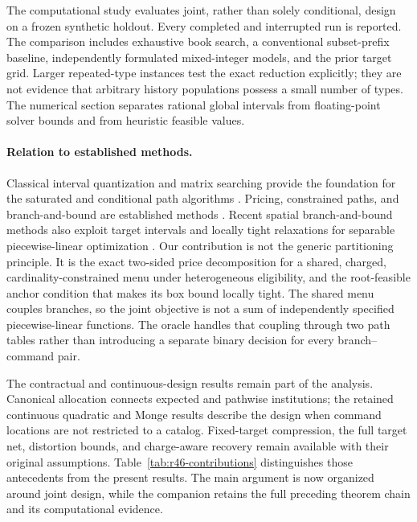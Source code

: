 The computational study evaluates joint, rather than solely conditional, design on a frozen synthetic holdout. Every completed and interrupted run is reported. The comparison includes exhaustive book search, a conventional subset-prefix baseline, independently formulated mixed-integer models, and the prior target grid. Larger repeated-type instances test the exact reduction explicitly; they are not evidence that arbitrary history populations possess a small number of types. The numerical section separates rational global intervals from floating-point solver bounds and from heuristic feasible values.

\paragraph{Relation to established methods.}\label{sec:r37-position}
Classical interval quantization and matrix searching provide the foundation for the saturated and conditional path algorithms \citep{Wu1991,NielsenNock2014,GronlundEtAl2017}. Pricing, constrained paths, and branch-and-bound are established methods \citep{HandlerZang1980,LawlerWood1966,Lemarechal2001}. Recent spatial branch-and-bound methods also exploit target intervals and locally tight relaxations for separable piecewise-linear optimization \citep{HubnerEtAl2025}. Our contribution is not the generic partitioning principle. It is the exact two-sided price decomposition for a shared, charged, cardinality-constrained menu under heterogeneous eligibility, and the root-feasible anchor condition that makes its box bound locally tight. The shared menu couples branches, so the joint objective is not a sum of independently specified piecewise-linear functions. The oracle handles that coupling through two path tables rather than introducing a separate binary decision for every branch--command pair.

The contractual and continuous-design results remain part of the analysis. Canonical allocation connects expected and pathwise institutions; the retained continuous quadratic and Monge results describe the design when command locations are not restricted to a catalog. Fixed-target compression, the full target net, distortion bounds, and charge-aware recovery remain available with their original assumptions. Table~\ref{tab:r46-contributions} distinguishes those antecedents from the present results. The main argument is now organized around joint design, while the companion retains the full preceding theorem chain and its computational evidence.
